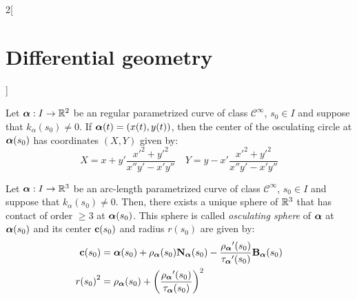 \documentclass[../../../main.tex]{subfiles}
\begin{document}
\begin{multicols}{2}[\section{Differential geometry}]
\begin{proposition}
    Let $\boldsymbol{\mathrm{\alpha}}:I\rightarrow\mathbb{R}^2$ be an regular parametrized curve of class $\mathcal{C}^\infty$, $s_0\in I$ and suppose that $k_\alpha(s_0)\ne 0$. If $\boldsymbol{\mathrm{\alpha}}(t)=(x(t),y(t))$, then the center of the osculating circle at $\boldsymbol{\mathrm{\alpha}}(s_0)$ has coordinates $(X,Y)$ given by:
    $$X=x+y'\frac{{x'}^2+{y'}^2}{x''y'-x'y''}\quad Y=y-x'\frac{{x'}^2+{y'}^2}{x''y'-x'y''}$$
  \end{proposition}
  \begin{center}
    \begin{minipage}{\linewidth}
      \centering
      
    \end{minipage}
  \end{center}
  \begin{definition}
    Let $\boldsymbol{\mathrm{\alpha}}:I\rightarrow\mathbb{R}^3$ be an arc-length parametrized curve of class $\mathcal{C}^\infty$, $s_0\in I$ and suppose that $k_\alpha(s_0)\ne 0$. Then, there exists a unique sphere of $\mathbb{R}^3$ that has contact of order $\geq 3$ at $\boldsymbol{\mathrm{\alpha}}(s_0)$. This sphere is called \emph{osculating sphere} of $\boldsymbol{\mathrm{\alpha}}$ at $\boldsymbol{\mathrm{\alpha}}(s_0)$ and its center $\boldsymbol{\mathrm{c}}(s_0)$ and radius $r(s_0)$ are given by:
    \begin{align*}
      \boldsymbol{\mathrm{c}}(s_0) & =\boldsymbol{\mathrm{\alpha}}(s_0)+{\rho_{\boldsymbol{\mathrm{\alpha}}}}(s_0){\boldsymbol{\mathrm{N}}_{\boldsymbol{\mathrm{\alpha}}}}(s_0)-\frac{{\rho_{\boldsymbol{\mathrm{\alpha}}}}'(s_0)}{{\tau_{\boldsymbol{\mathrm{\alpha}}}}'(s_0)}{\boldsymbol{\mathrm{B}}_{\boldsymbol{\mathrm{\alpha}}}}(s_0) \\
      {r(s_0)}^2  & ={\rho_{\boldsymbol{\mathrm{\alpha}}}}(s_0)+{\left(\frac{{\rho_{\boldsymbol{\mathrm{\alpha}}}}'(s_0)}{{\tau_{\boldsymbol{\mathrm{\alpha}}}}(s_0)}\right)}^2
    \end{align*}
  \end{definition}

\end{multicols}
\end{document}
